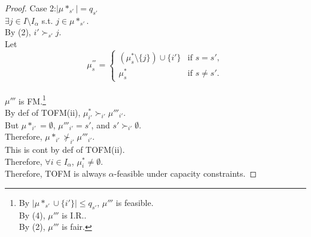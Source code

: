 \documentclass[a4j,10pt]{jsarticle}
\theoremstyle{definition}
\theoremstyle{remark}
\theoremstyle{plain}
\begin{document}
\begin{tcolorbox}
\begin{proof}
    Case 2:$|\mu*_{s'}| = q_{s'}$\\
    $\exists j \in I\setminus I_\alpha$ s.t. $j \in \mu*_{s'}$.\\
    By (2), $i' \succ_{s'} j$.\\
    Let \[
        \mu^{'''}_s =
        \begin{cases}
        (\mu^*_s\setminus \{j\}) \cup \{i'\} & \text{if } s = s', \\
        \mu^*_s & \text{if } s \neq s'.
        \end{cases}
        \]\\
    $\mu'''$ is FM.\footnote{By $|\mu*_{s'} \cup \{i'\}| \leq q_{s'}$, $\mu'''$ is feasible.\\By (4), $\mu'''$ is I.R..\\ By (2), $\mu'''$ is fair.}\\
    By def of TOFM(ii), $\mu^*_{i'} \succ_{i'} \mu'''_{i'}$.\\
    But $\mu*_{i'} = \emptyset $, $\mu'''_{i'} = s'$, and $s' \succ_{i'} \emptyset$.\\
    Therefore, $\mu*_{i'} \nsucc_{i'} \mu'''_{i'}$.\\
    This is cont by def of TOFM(ii).\\
    Therefore, $\forall i \in I_\alpha$, $\mu^*_i \neq \emptyset$.\\
    Therefore, TOFM is always $\alpha$-feasible under capacity constraints.
  \end{proof}


\end{tcolorbox}
\end{document}
